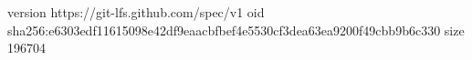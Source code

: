 version https://git-lfs.github.com/spec/v1
oid sha256:e6303edf11615098e42df9eaacbfbef4e5530cf3dea63ea9200f49cbb9b6c330
size 196704
